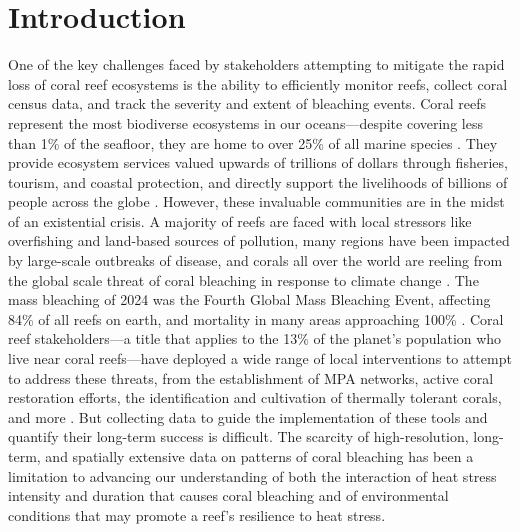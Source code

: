 \documentclass[11pt]{elsarticle}
\begin{document}
\section{Introduction}
One of the key challenges faced by stakeholders attempting to mitigate the rapid loss of coral reef ecosystems is the ability to efficiently monitor reefs, collect coral census data, and track the severity and extent of bleaching events. Coral reefs represent the most biodiverse ecosystems in our oceans---despite covering less than 1\% of the seafloor, they are home to over 25\% of all marine species \citep{reakakudla1997}. They provide ecosystem services valued upwards of trillions of dollars through fisheries, tourism, and coastal protection, and directly support the livelihoods of billions of people across the globe \citep{costanza2014,sing2022}. However, these invaluable communities are in the midst of an existential crisis. A majority of reefs are faced with local stressors like overfishing and land-based sources of pollution, many regions have been impacted by large-scale outbreaks of disease, and corals all over the world are reeling from the global scale threat of coral bleaching in response to climate change \citep{burke2011reefs,vega2025, hughes2017}. The mass bleaching of 2024 was the Fourth Global Mass Bleaching Event, affecting 84\% of all reefs on earth, and mortality in many areas approaching 100\% \cite{spady2025,birkart2025}. Coral reef stakeholders---a title that applies to the 13\% of the planet's population who live near coral reefs---have deployed a wide range of local interventions to attempt to address these threats, from the establishment of MPA networks, active coral restoration efforts, the identification and cultivation of thermally tolerant corals, and more \citep{strain2019, bostrom2020}. But collecting data to guide the implementation of these tools and quantify their long-term success is difficult. The scarcity of high-resolution, long-term, and spatially extensive data on patterns of coral bleaching has been a limitation to advancing our understanding of both the interaction of heat stress intensity and duration that causes coral bleaching and of environmental conditions that may promote a reef's resilience to heat stress.
\end{document}
